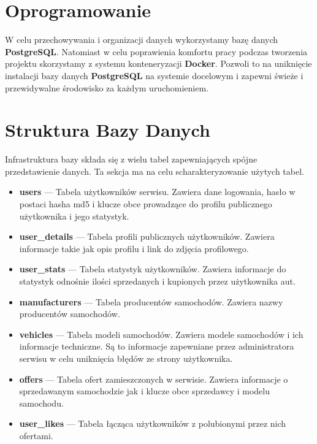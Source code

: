 \documentclass[a4paper,11pt]{article}
\begin{document}
\section*{Oprogramowanie}
W celu przechowywania i organizacji danych wykorzystamy bazę danych \textbf{PostgreSQL}.
Natomiast w celu poprawienia komfortu pracy podczas tworzenia projektu skorzystamy z systemu konteneryzacji \textbf{Docker}.
Pozwoli to na uniknięcie instalacji bazy danych \textbf{PostgreSQL} na systemie docelowym i zapewni świeże i przewidywalne środowisko za każdym uruchomieniem.

\pagebreak
\section*{Struktura Bazy Danych}
Infrastruktura bazy składa się z wielu tabel zapewniających spójne przedstawienie danych.
Ta sekcja ma na celu scharakteryzowanie użytych tabel.

\begin{itemize}
    \item \textbf{users} --- Tabela użytkowników serwisu.  Zawiera dane logowania, hasło w postaci hasha md5 i klucze obce prowadzące do profilu publicznego użytkownika i jego statystyk.
    \item \textbf{user\_details} --- Tabela profili publicznych użytkowników. Zawiera informacje takie jak opis profilu i link do zdjęcia profilowego.
    \item \textbf{user\_stats} --- Tabela statystyk użytkowników. Zawiera informacje do statystyk odnośnie ilości sprzedanych i kupionych przez użytkownika aut.
    \item \textbf{manufacturers} --- Tabela producentów samochodów. Zawiera nazwy producentów samochodów.
    \item \textbf{vehicles} --- Tabela modeli samochodów. Zawiera modele samochodów i ich informacje techniczne. Są to informacje zapewniane przez administratora serwisu w celu uniknięcia błędów ze strony użytkownika.
    \item \textbf{offers} --- Tabela ofert zamieszczonych w serwisie. Zawiera informacje o sprzedawanym samochodzie jak i klucze obce sprzedawcy i modelu samochodu.
    \item \textbf{user\_likes} --- Tabela łącząca użytkowników z polubionymi przez nich ofertami.
\end{itemize}
\end{document}
